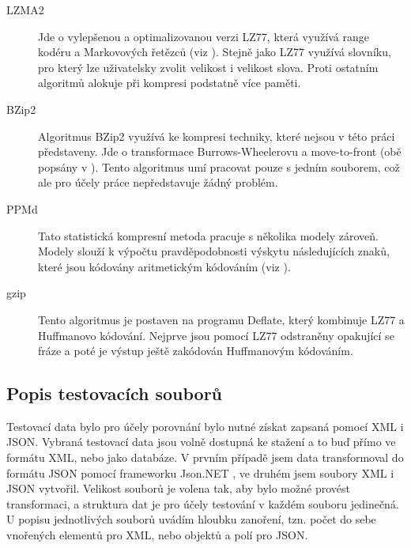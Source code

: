 \begin{description}
\item[LZMA2] Jde o vylepšenou a optimalizovanou verzi LZ77, která využívá range kodéru a Markovových řetězců (viz \cite{introductionToDataCompression}). Stejně jako LZ77 využívá slovníku, pro který lze uživatelsky zvolit velikost i velikost slova. Proti ostatním algoritmů alokuje při kompresi podstatně více paměti.
\item[BZip2] Algoritmus BZip2 využívá ke kompresi techniky, které nejsou v této práci představeny. Jde o transformace Burrows-Wheelerovu a move-to-front (obě popsány v \cite{introductionToDataCompression}). Tento algoritmus umí pracovat pouze s jedním souborem, což ale pro účely práce nepředstavuje žádný problém.
\item[PPMd] Tato statistická kompresní metoda pracuje s několika modely zároveň. Modely slouží k výpočtu pravděpodobnosti výskytu následujících znaků, které jsou kódovány aritmetickým kódováním (viz \cite{introductionToDataCompression}).
\item[gzip] Tento algoritmus je postaven na programu Deflate, který kombinuje LZ77 a Huffmanovo kódování. Nejprve jsou pomocí LZ77 odstraněny opakující se fráze a poté je výstup ještě zakódován Huffmanovým kódováním. 
\end{description}

\subsection{Popis testovacích souborů}
Testovací data bylo pro účely porovnání bylo nutné získat zapsaná pomocí XML i JSON. Vybraná testovací data jsou volně dostupná ke stažení a to buď přímo ve formátu XML, nebo jako databáze. V prvním případě jsem data transformoval do formátu JSON pomocí frameworku Json.NET \cite{jsonNET}, ve druhém jsem soubory XML i JSON vytvořil. Velikost souborů je volena tak, aby bylo možné provést transformaci, a struktura dat je pro účely testování v každém souboru jedinečná. U popisu jednotlivých souborů uvádím hloubku zanoření, tzn. počet do sebe vnořených elementů pro XML, nebo objektů a polí pro JSON.

